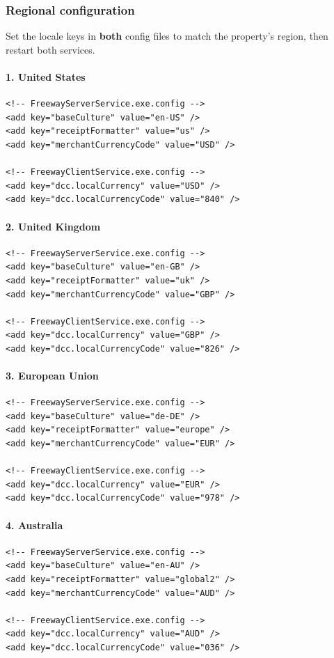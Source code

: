 \documentclass[a4paper,10pt]{article}
\begin{document}
\subsubsection{Regional configuration}

Set the locale keys in \textbf{both} config files to match the property's
region, then restart both services.

\paragraph{1. United States}
\begin{lstlisting}
<!-- FreewayServerService.exe.config -->
<add key="baseCulture" value="en-US" />
<add key="receiptFormatter" value="us" />
<add key="merchantCurrencyCode" value="USD" />

<!-- FreewayClientService.exe.config -->
<add key="dcc.localCurrency" value="USD" />
<add key="dcc.localCurrencyCode" value="840" />
\end{lstlisting}

\paragraph{2. United Kingdom}
\begin{lstlisting}
<!-- FreewayServerService.exe.config -->
<add key="baseCulture" value="en-GB" />
<add key="receiptFormatter" value="uk" />
<add key="merchantCurrencyCode" value="GBP" />

<!-- FreewayClientService.exe.config -->
<add key="dcc.localCurrency" value="GBP" />
<add key="dcc.localCurrencyCode" value="826" />
\end{lstlisting}

\paragraph{3. European Union}
\begin{lstlisting}
<!-- FreewayServerService.exe.config -->
<add key="baseCulture" value="de-DE" />
<add key="receiptFormatter" value="europe" />
<add key="merchantCurrencyCode" value="EUR" />

<!-- FreewayClientService.exe.config -->
<add key="dcc.localCurrency" value="EUR" />
<add key="dcc.localCurrencyCode" value="978" />
\end{lstlisting}

\paragraph{4. Australia}
\begin{lstlisting}
<!-- FreewayServerService.exe.config -->
<add key="baseCulture" value="en-AU" />
<add key="receiptFormatter" value="global2" />
<add key="merchantCurrencyCode" value="AUD" />

<!-- FreewayClientService.exe.config -->
<add key="dcc.localCurrency" value="AUD" />
<add key="dcc.localCurrencyCode" value="036" />
\end{lstlisting}
\end{document}
